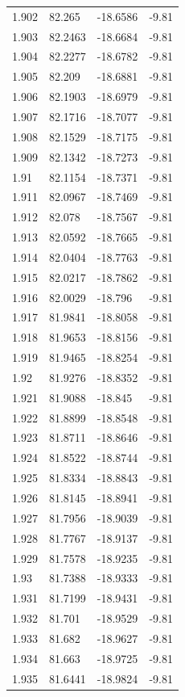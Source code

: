 \begin{tabular}{llll}
1.902 & 82.265 & -18.6586 & -9.81 \\
1.903 & 82.2463 & -18.6684 & -9.81 \\
1.904 & 82.2277 & -18.6782 & -9.81 \\
1.905 & 82.209 & -18.6881 & -9.81 \\
1.906 & 82.1903 & -18.6979 & -9.81 \\
1.907 & 82.1716 & -18.7077 & -9.81 \\
1.908 & 82.1529 & -18.7175 & -9.81 \\
1.909 & 82.1342 & -18.7273 & -9.81 \\
1.91 & 82.1154 & -18.7371 & -9.81 \\
1.911 & 82.0967 & -18.7469 & -9.81 \\
1.912 & 82.078 & -18.7567 & -9.81 \\
1.913 & 82.0592 & -18.7665 & -9.81 \\
1.914 & 82.0404 & -18.7763 & -9.81 \\
1.915 & 82.0217 & -18.7862 & -9.81 \\
1.916 & 82.0029 & -18.796 & -9.81 \\
1.917 & 81.9841 & -18.8058 & -9.81 \\
1.918 & 81.9653 & -18.8156 & -9.81 \\
1.919 & 81.9465 & -18.8254 & -9.81 \\
1.92 & 81.9276 & -18.8352 & -9.81 \\
1.921 & 81.9088 & -18.845 & -9.81 \\
1.922 & 81.8899 & -18.8548 & -9.81 \\
1.923 & 81.8711 & -18.8646 & -9.81 \\
1.924 & 81.8522 & -18.8744 & -9.81 \\
1.925 & 81.8334 & -18.8843 & -9.81 \\
1.926 & 81.8145 & -18.8941 & -9.81 \\
1.927 & 81.7956 & -18.9039 & -9.81 \\
1.928 & 81.7767 & -18.9137 & -9.81 \\
1.929 & 81.7578 & -18.9235 & -9.81 \\
1.93 & 81.7388 & -18.9333 & -9.81 \\
1.931 & 81.7199 & -18.9431 & -9.81 \\
1.932 & 81.701 & -18.9529 & -9.81 \\
1.933 & 81.682 & -18.9627 & -9.81 \\
1.934 & 81.663 & -18.9725 & -9.81 \\
1.935 & 81.6441 & -18.9824 & -9.81 \\

\end{tabular}
